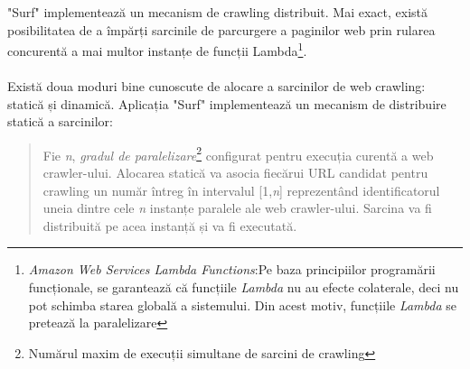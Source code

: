 "Surf" implementează un mecanism de crawling distribuit. Mai exact, există posibilitatea de a împărți sarcinile de parcurgere a paginilor web prin rularea concurentă a mai multor instanțe de funcții Lambda\footnote{\textit{Amazon Web Services Lambda Functions}:Pe baza principiilor programării funcționale, se garantează că funcțiile \textit{Lambda} nu au efecte colaterale, deci nu pot schimba starea globală a sistemului. Din acest motiv, funcțiile \textit{Lambda} se pretează la paralelizare}.
\\
\\
Există doua moduri bine cunoscute de alocare a sarcinilor de web crawling: statică și dinamică\cite{distribution-of-crawling-tasks}. Aplicația "Surf" implementează un mecanism de distribuire statică a sarcinilor:
\begin{quote}
	Fie \emph{n}, \emph{gradul de paralelizare}\footnote{Numărul maxim de execuții simultane de sarcini de crawling} configurat pentru execuția curentă a web crawler-ului. Alocarea statică va asocia fiecărui URL candidat pentru crawling un număr întreg în intervalul [1,\emph{n}] reprezentând identificatorul uneia dintre cele \emph{n} instanțe paralele ale web crawler-ului. Sarcina va fi distribuită pe acea instanță și va fi executată.
\end{quote}
